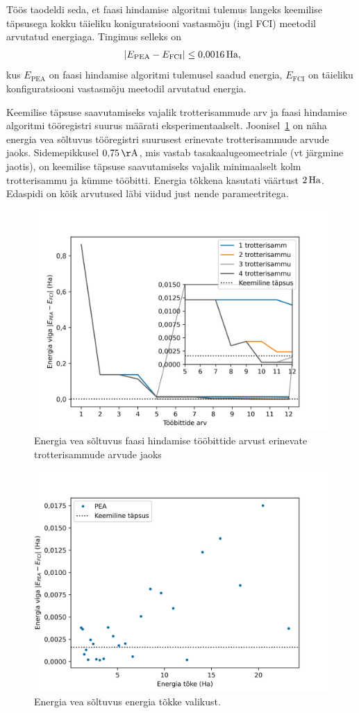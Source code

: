 \documentclass[12pt]{report}
\def\abs#1{\left|#1\right|}
\begin{document}
Töös taodeldi seda, et faasi hindamise algoritmi tulemus langeks keemilise täpsusega kokku täieliku koniguratsiooni vastasmõju (ingl FCI) meetodil arvutatud energiaga.
Tingimus selleks on
\begin{align}
  \abs{E_\text{PEA} - E_\text{FCI}} \le 0{,}0016\,{\rm Ha} \rlap{,}
\end{align}
kus \(E_\text{PEA}\) on faasi hindamise algoritmi tulemusel saadud energia, \(E_\text{FCI}\) on täieliku konfiguratsiooni vastasmõju meetodil arvutatud energia.

Keemilise täpsuse saavutamiseks vajalik trotterisammude arv ja faasi hindamise algoritmi tööregistri suurus määrati eksperimentaalselt.
Joonisel~\ref{fig:bitstrots} on näha energia vea sõltuvus tööregistri suurusest erinevate trotterisammude arvude jaoks.
Sidemepikkusel \(0{,}75\,{\rm Å}\), mis vastab tasakaalugeomeetriale (vt järgmine jaotis), on keemilise täpsuse saavutamiseks vajalik minimaalselt kolm trotterisammu ja kümme tööbitti.
Energia tõkkena kasutati väärtust \(2\,{\rm Ha}\).
Edaspidi on kõik arvutused läbi viidud just nende parameetritega.

\begin{figure}[h]
  \centering
  \includegraphics[width=.65\hsize]{bitstrots.jpg}
  \caption{Energia vea sõltuvus faasi hindamise tööbittide arvust erinevate trotterisammude arvude jaoks}
  \label{fig:bitstrots}
\end{figure}

\begin{figure}[h]
  \centering
  \includegraphics[width=.65\hsize]{bounds.jpg}
  \caption{Energia vea sõltuvus energia tõkke valikust.}
  \label{fig:bounds}
\end{figure}
\end{document}

